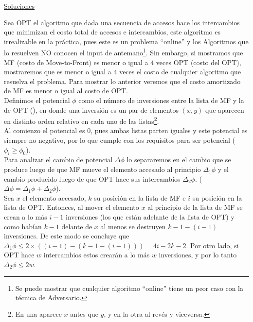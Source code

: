 \documentclass[dcc,uchile]{fcfmcourse}
\begin{document}
\newpage
\begin{center}
{\huge \underline{Soluciones}}
\end{center}
\begin{problems}
\item Sea OPT el algoritmo que dada una secuencia de accesos hace los intercambios que minimizan el costo total de accesos e intercambios, este algoritmo es irrealizable en la práctica, pues este es un problema ``online'' y los Algoritmos que lo resuelven NO conocen el input de antemano\footnote{Se puede mostrar que cualquier algoritmo ``online'' tiene un peor caso con la técnica de Adversario.}\demon. Sin embargo, si mostramos que MF (costo de Move-to-Front) es menor o igual a $4$ veces OPT (costo del OPT), mostraremos que es menor o igual a $4$ veces el costo de cualquier algoritmo que resuelva el problema. Para mostrar lo anterior veremos que el costo amortizado de MF es menor o igual al costo de OPT.\\

Definimos el potencial $\phi$ como el número de inversiones entre la lista de MF y la de OPT (\magic), en donde una inversión es un par de elementos $(x, y)$ que aparecen en distinto orden relativo en cada uno de las listas\footnote{En una aparece $x$ antes que $y$, y en la otra al revés y viceversa.}.\\
Al comienzo el potencial es $0$, pues ambas listas parten iguales y este potencial es siempre no negativo, por lo que cumple con los requisitos para ser potencial ($\phi_i \ge \phi_{0}$).\\
Para analizar el cambio de potencial $\Delta \phi$ lo separaremos en el cambio que se produce luego de que MF mueve el elemento accesado al principio $\Delta_{1} \phi$ y el cambio producido luego de que OPT hace sus intercambios $\Delta_{2} \phi$. ($\Delta \phi = \Delta_{1} \phi + \Delta_{2} \phi$).\\

Sea $x$ el elemento accesado, $k$ su posición en la lista de MF e $i$ su posición en la lista de OPT.  Entonces, al mover el elemento $x$ al principio de la lista de MF se crean a lo más $i-1$ inversiones (los que están adelante de la lista de OPT) y como habían $k-1$ delante de $x$ al menos se destruyen $k-1 - (i-1)$ inversiones. De este modo se concluye que $\Delta_{1} \phi \le 2\times((i-1) - (k-1 - (i-1))) = 4i - 2k - 2$. Por otro lado, si OPT hace $w$ intercambios estos crearán a lo más $w$ inversiones, y por lo tanto $\Delta_{2} \phi \le 2w$.\\


\end{problems}
\end{document}
